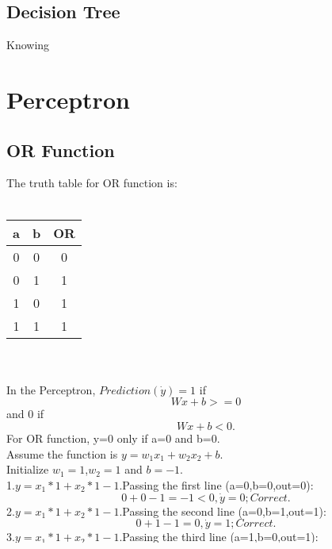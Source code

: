 \documentclass{article}
\begin{document}
\subsection{Decision Tree}
Knowing 



\section{Perceptron}
\subsection{OR Function}
The truth table for OR function is:\\
\\
\begin{tabular}{|c|c|c|}
\hline
a&b&OR\\
\hline
0&0&0\\
0&1&1\\
1&0&1\\
1&1&1\\
\hline
\end{tabular}\\
\\
In the Perceptron, $Prediction (\dot y) = 1$ if $$Wx+b >= 0$$ and 0 if $$Wx+b<0.$$
For OR function, y=0 only if a=0 and b=0.\\
Assume the function is $y=w_1 x_1+w_2 x_2+b$.\\
Initialize $w_1=1$,$w_2=1$ and $b=-1$.\\
1.$y=x_1 *1+x_2 *1-1$.Passing the first line (a=0,b=0,out=0):$$0+0-1=-1<0,\dot y =0;Correct.$$
2.$y=x_1 *1+x_2 *1-1$.Passing the second line (a=0,b=1,out=1):$$0+1-1=0,\dot y =1;Correct.$$ 
3.$y=x_1 *1+x_2 *1-1$.Passing the third line (a=1,b=0,out=1):$$1+0-1=0,\dot y =1;Correct.$$ 
4.$y=x_1 *1+x_2 *1-1$.Passing the fourth line (a=1,b=1,out=1):$$1+1-1=1,\dot y =1;Correct.$$ 
This shows the perceptron fit OR function well with set of inequalities.
\end{document}
